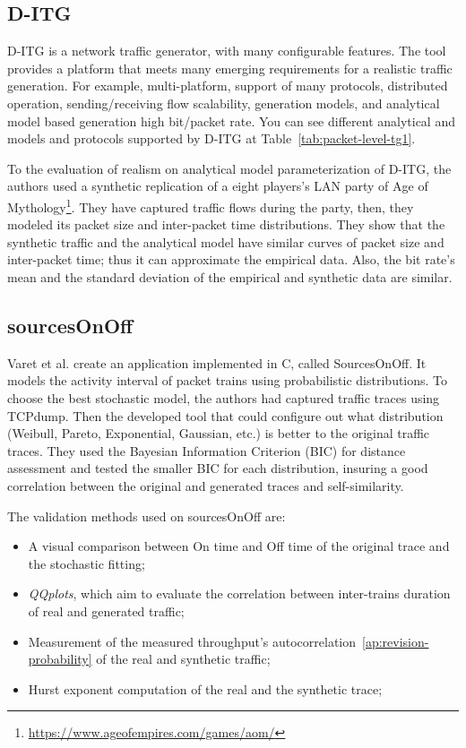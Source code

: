 \subsection{D-ITG}


D-ITG\cite{ditg-paper} is a network traffic generator, with many configurable features. The tool provides a platform that meets many emerging requirements for a realistic traffic generation. For example, multi-platform, support of many protocols, distributed operation, sending/receiving flow scalability, generation models, and analytical model based generation high bit/packet rate. You can see different analytical and models and protocols supported by D-ITG at Table~\ref{tab:packet-level-tg1}.

To the evaluation of realism on analytical model parameterization of D-ITG, the authors used a synthetic replication of a eight players's LAN party of Age of Mythology\footnote{\href{https://www.ageofempires.com/games/aom/}{https://www.ageofempires.com/games/aom/}}. They have captured traffic flows during the party,  then, they modeled its packet size and inter-packet time distributions. They show that the synthetic traffic and the analytical model have similar curves of packet size and inter-packet time; thus it can approximate the empirical data. Also, the bit rate's mean and the standard deviation of the empirical and synthetic data are similar.

\subsection{sourcesOnOff}

Varet et al.\cite{sourcesonoff-paper} create an application implemented in C, called SourcesOnOff. It models the activity interval of packet trains using probabilistic distributions. To choose the best stochastic model, the authors had captured traffic traces using TCPdump. Then the developed tool that could configure out what distribution (Weibull, Pareto, Exponential, Gaussian, etc.) is better to the original traffic traces. They used the Bayesian Information Criterion (BIC) for distance assessment and tested the smaller BIC for each distribution, insuring a good correlation between the original and generated traces and self-similarity.  

The validation methods used on sourcesOnOff are:

\begin{itemize}
\item A visual comparison between On time and Off time of the original trace and the stochastic fitting;
\item \textit{QQplots}, which aim to evaluate the correlation between inter-trains duration of real and generated traffic;
\item Measurement of the measured throughput's autocorrelation~\ref{ap:revision-probability} of the real and synthetic traffic;
\item Hurst exponent computation of the real and the synthetic trace;
\end{itemize}

